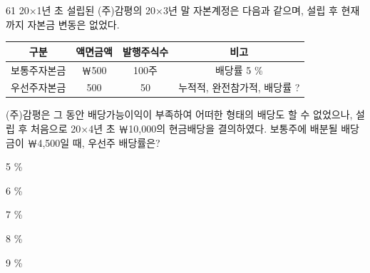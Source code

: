 \begin{question}{61}
20×1년 초 설립된 (주)감평의 20×3년 말 자본계정은 다음과 같으며, 설립 후 현재까지 자본금 변동은 없었다.
\par{\small\centering
\begin{tabular}{|c|c|c|c|}\hline
구분 & 액면금액 & 발행주식수 & 비고 \\ \hline
보통주자본금 & ￦500 & 100주 & 배당률 5 \% \\ \hline
우선주자본금 & 500 & 50 & 누적적, 완전참가적, 배당률 ? \\ \hline
\end{tabular}
\par}
(주)감평은 그 동안 배당가능이익이 부족하여 어떠한 형태의 배당도 할 수 없었으나, 설립 후 처음으로 20×4년 초 ￦10,000의 현금배당을 결의하였다. 보통주에 배분될 배당금이 ￦4,500일 때, 우선주 배당률은?
\begin{choices}
  \item 5 \%
  \item 6 \%
  \item 7 \%
  \item 8 \%
  \item 9 \%
\end{choices}
\end{question}
